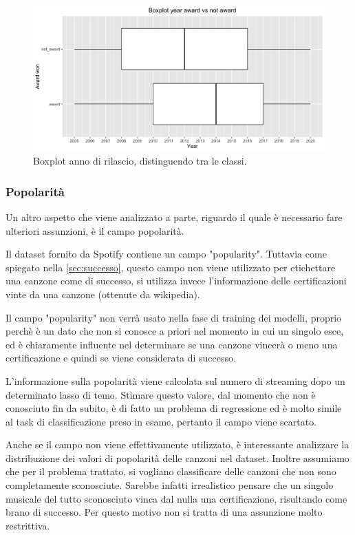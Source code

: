  \begin{figure}[H]
 	\centering
 	\includegraphics[width=13cm]{../images/year_award_comparison.png}
 	\caption{Boxplot anno di rilascio, distinguendo tra le classi.}
 	\label{fig:year_boxplot_award}
 \end{figure}
 
\subsubsection{Popolarità}
\label{sec:popularity}
Un altro aspetto che viene analizzato a parte, riguardo il quale è
necessario fare ulteriori assunzioni, è il campo popolarità.

Il dataset fornito da Spotify contiene un campo "popularity". Tuttavia
come spiegato nella \autoref{sec:successo}, questo campo non viene
utilizzato per etichettare una canzone come di successo, si utilizza
invece l'informazione delle certificazioni vinte da una canzone
(ottenute da wikipedia).

Il campo "popularity" non verrà usato nella fase di training dei
modelli, proprio perchè è un dato che non si conosce a priori nel
momento in cui un singolo esce, ed è chiaramente influente nel
determinare se una canzone vincerà o meno una certificazione e quindi
se viene considerata di successo.

L'informazione sulla popolarità viene calcolata sul numero di
streaming dopo un determinato lasso di temo. Stimare questo valore,
dal momento che non è conosciuto fin da subito, è di fatto un problema
di regressione ed è molto simile al task di classificazione preso in
esame, pertanto il campo viene scartato.

Anche se il campo non viene effettivamente utilizzato, è interessante
analizzare la distribuzione dei valori di popolarità delle canzoni nel
dataset. Inoltre assumiamo che per il problema trattato, si vogliano
classificare delle canzoni che non sono completamente
sconosciute. Sarebbe infatti irrealistico pensare che un singolo
musicale del tutto sconosciuto vinca dal nulla una certificazione,
risultando come brano di successo.  Per questo motivo non si tratta di
una assunzione molto restrittiva.

